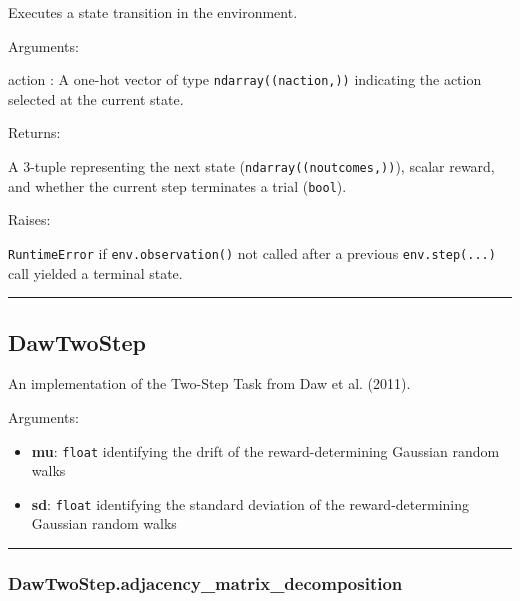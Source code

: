 Executes a state transition in the environment.

Arguments:

action : A one-hot vector of type \texttt{ndarray((naction,))}
indicating the action selected at the current state.

Returns:

A 3-tuple representing the next state (\texttt{ndarray((noutcomes,))}),
scalar reward, and whether the current step terminates a trial
(\texttt{bool}).

Raises:

\texttt{RuntimeError} if \texttt{env.observation()} not called after a
previous \texttt{env.step(...)} call yielded a terminal state.

\begin{center}\rule{0.5\linewidth}{\linethickness}\end{center}

\subsection{DawTwoStep}\label{dawtwostep}

\begin{Shaded}
\begin{Highlighting}[]
\end{Highlighting}
\end{Shaded}

An implementation of the Two-Step Task from Daw et al. (2011).

Arguments:

\begin{itemize}
\tightlist
\item
  \textbf{mu}: \texttt{float} identifying the drift of the
  reward-determining Gaussian random walks
\item
  \textbf{sd}: \texttt{float} identifying the standard deviation of the
  reward-determining Gaussian random walks
\end{itemize}

\begin{center}\rule{0.5\linewidth}{\linethickness}\end{center}

\subsubsection{DawTwoStep.adjacency\_matrix\_decomposition}\label{dawtwostep.adjacency_matrix_decomposition}

